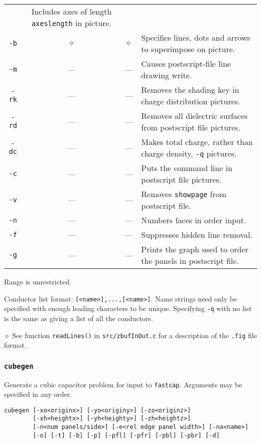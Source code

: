 \begin{center}
\begin{tabular}{ccll}
&Includes axes of length \mbox{\tt axeslength} in picture.\\
\mbox{\tt -b}& $\diamond $ & $\diamond $
&Specifies lines, dots and arrows to superimpose on picture.\\
\mbox{\tt -m}& --- & ---
&Causes postscript-file line drawing write.\\
\mbox{\tt -rk}& --- & ---
&Removes the shading key in charge distribution pictures.\\
\mbox{\tt -rd}& --- & ---
&Removes all dielectric surfaces from postscript file pictures.\\
\mbox{\tt -dc}& --- & ---
&Makes total charge, rather than charge density, {\tt -q} pictures.\\
\mbox{\tt -c}& --- & ---
&Puts the command line in postscript file pictures.\\
\mbox{\tt -v}& --- & ---
&Removes {\tt showpage} from postscript file.\\
\mbox{\tt -n}& --- & ---
&Numbers faces in order input.\\
\mbox{\tt -f}& --- & ---
&Suppresses hidden line removal.\\
\mbox{\tt -g}& --- & ---
&Prints the graph used to order the panels in postscript file.\\
\hline
\end{tabular}
\end{center}
\noindent\dag Range is unrestricted.

\noindent\ddag Conductor list format: {\tt [<name>],...,[<name>]}. Name
strings need only be specified with enough leading characters to be unique.
Specifying {\tt -q} with no list is the same as giving a list of all the
conductors.

\noindent$\diamond $ See function {\tt readLines()} in {\tt src/zbufInOut.c}
for a description of the {\tt .fig} file format.

\subsubsection*{\tt cubegen}

Generate a cubic capacitor problem for input to {\tt fastcap}. Arguments
may be specified in any order.
\begin{verbatim}
cubegen [-xo<originx>] [-yo<originy>] [-zo<originz>]
        [-xh<heightx>] [-yh<heighty>] [-zh<heightz>]
        [-n<num panels/side>] [-e<rel edge panel width>] [-na<name>]
        [-o] [-t] [-b] [-p] [-pfl] [-pfr] [-pbl] [-pbr] [-d]
\end{verbatim}


